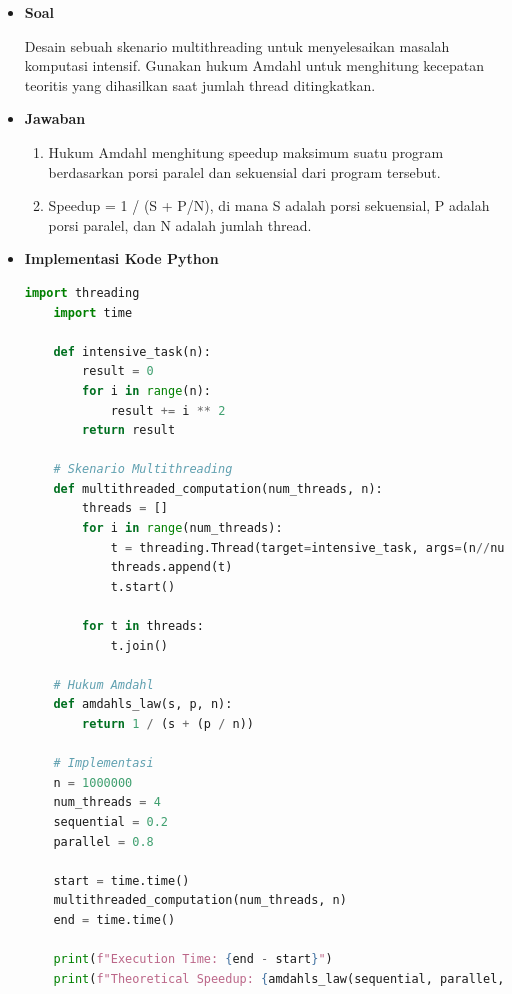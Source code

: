 \documentclass[12pt]{article}
\begin{document}
\begin{itemize}
    \item\textbf{Soal} 
    \par Desain sebuah skenario multithreading untuk menyelesaikan masalah komputasi intensif. Gunakan hukum Amdahl untuk menghitung kecepatan teoritis yang dihasilkan saat jumlah thread ditingkatkan.
    \item\textbf{Jawaban} 
    \begin{enumerate}
        \item Hukum Amdahl menghitung speedup maksimum suatu program berdasarkan porsi paralel dan sekuensial dari program tersebut.
        \item Speedup = 1 / (S + P/N), di mana S adalah porsi sekuensial, P adalah porsi paralel, dan N adalah jumlah thread.
    \end{enumerate} 

    \item\textbf{Implementasi Kode Python}

        \lstset{style=mystyle}

    \begin{lstlisting}[language=Python, caption=Multithreading dan Amdahl's Law]
    import threading
    import time
    
    def intensive_task(n):
        result = 0
        for i in range(n):
            result += i ** 2
        return result
    
    # Skenario Multithreading
    def multithreaded_computation(num_threads, n):
        threads = []
        for i in range(num_threads):
            t = threading.Thread(target=intensive_task, args=(n//num_threads,))
            threads.append(t)
            t.start()
    
        for t in threads:
            t.join()
    
    # Hukum Amdahl
    def amdahls_law(s, p, n):
        return 1 / (s + (p / n))
    
    # Implementasi
    n = 1000000
    num_threads = 4
    sequential = 0.2
    parallel = 0.8
    
    start = time.time()
    multithreaded_computation(num_threads, n)
    end = time.time()
    
    print(f"Execution Time: {end - start}")
    print(f"Theoretical Speedup: {amdahls_law(sequential, parallel, num_threads)}")
    \end{lstlisting}

    \end{itemize}
\end{document}
